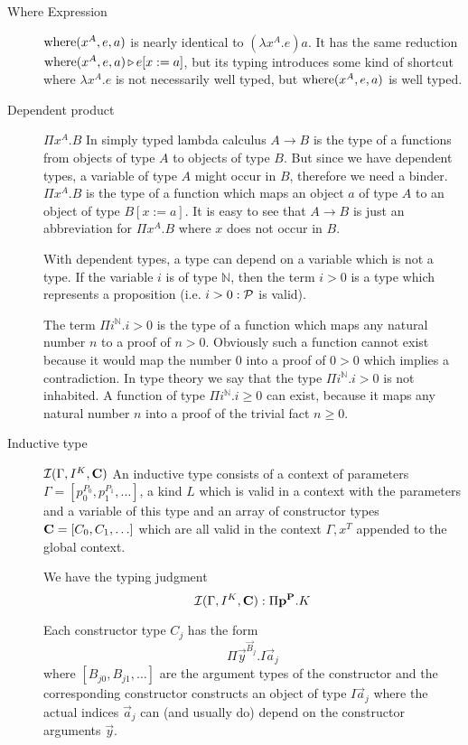 \begin{description}
\item[Where Expression]
    $\text{where}(x^A,e,a)$ is nearly identical to $(\lambda x^A.e) a$. It has the
    same reduction $\text{where}(x^A,e,a) {\,\triangleright\,} e[x:=a]$, but its typing introduces
    some kind of shortcut where $\lambda x^A.e$ is not necessarily well typed,
    but $\text{where}(x^A,e,a)$ is well typed.

\item[Dependent product] $\Pi x^A.B$ In simply typed lambda calculus
  $A \to B$ is the type of a functions from objects of type $A$ to objects of
  type $B$. But since we have dependent types, a variable of type $A$ might
  occur in $B$, therefore we need a binder. $\Pi x^A. B$ is the type of a
  function which maps an object $a$ of type $A$ to an object of type
  $B[x:=a]$. It is easy to see that $A \to B$ is just an abbreviation for
  $\Pi x^A.B$ where $x$ does not occur in $B$.

  With dependent types, a type can depend on a variable which is not a
  type. If the variable $i$ is of type $\mathbb{N}$, then the term $i > 0$ is
  a type which represents a proposition (i.e. $i > 0: {\cal{P}}$ is valid).

  The term $\Pi i^{\mathbb{N}}. i > 0$ is the type of a function which maps
  any natural number $n$ to a proof of $n > 0$. Obviously such a function
  cannot exist because it would map the number $0$ into a proof of $0 > 0$
  which implies a contradiction. In type theory we say that the type
  $\Pi i^{\mathbb{N}}. i > 0$ is not inhabited. A function of type
  $\Pi i^{\mathbb{N}}. i \ge 0$ can exist, because it maps any natural number
  $n$ into a proof of the trivial fact $n \ge 0$.


\item[Inductive type] ${\cal I } (\Gamma,I^K,\mathbf{C})$
    An inductive type consists of a context of parameters $\Gamma = [p_0^{P_0},
        p_1^{P_1}, \ldots]$, a kind $L$ which is valid in a context with the
        parameters and a variable of this type and an array of constructor types
        $\mathbf{C} = [C_0, C_1, \ldots]$ which are all valid in the context
        $\Gamma, x^T$ appended to the global context.


        We have the typing judgment
        $$
            {\cal I } (\Gamma, I^K, \mathbf{C})
            : \Pi \mathbf{p}^{\mathbf{P}} . K
        $$


        Each constructor type $C_j$ has the form
        $$
        \Pi \vec{y}^{\vec{B}_j}. I \vec{a}_j
        $$
        where $[B_{j0}, B_{j1}, \ldots]$ are the argument types of the
        constructor and the corresponding constructor constructs an object of
        type $ I \vec{a}_j$ where the actual indices $\vec{a}_j$ can (and
        usually do) depend on the constructor arguments $\vec{y}$.


\end{description}
